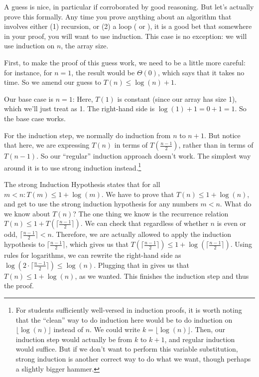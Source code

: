 A guess is nice, in particular if corroborated by good reasoning. But
let's actually prove this formally. Any time you prove anything about
an algorithm that involves either (1) recursion, or (2) a loop
( or ), it is a good bet that somewhere in your
proof, you will want to use induction.
This case is no exception: we will use induction on $n$, the array
size.

First, to make the proof of this guess work, we need to be a little more
careful: for instance, for $n=1$, the result would be $\Theta(0)$,
which says that it takes no time. So we amend our guess to
$T(n) \leq \log(n) + 1$.

Our base case is $n=1$: Here, $T(1)$ is constant (since our array has
size 1), which we'll just treat as 1. The right-hand side is
$\log(1) + 1 = 0+1 = 1$. So the base case works.

For the induction step, we normally do induction from $n$ to $n+1$. 
But notice that here, we are expressing $T(n)$ in terms of
$T(\frac{n-1}{2})$, rather than in terms of $T(n-1)$. 
So our ``regular'' induction approach doesn't work.
The simplest way around it is to use strong induction
instead.\footnote{For students sufficiently well-versed in induction
  proofs, it is worth noting that the ``clean'' way to do induction
  here would be to do induction on $\lfloor \log(n) \rfloor$ instead
  of $n$. We could write $k=\lfloor \log(n) \rfloor$. Then, our
  induction step would actually be from $k$ to $k+1$, and regular
  induction would suffice. But if we don't want to perform this
  variable substitution, strong induction is another correct way to do
  what we want, though perhaps a slightly bigger hammer.}

The strong Induction Hypothesis states that for all 
$m < n: T(m) \leq 1 + \log(m)$.
We have to prove that $T(n) \leq 1 + \log(n)$, and get to use the
strong induction hypothesis for any numbers $m < n$.
What do we know about $T(n)$? The one thing we know is the recurrence
relation $T(n) \leq 1 + T(\lceil \frac{n-1}{2} \rceil)$.
We can check that regardless of whether $n$ is even or odd, 
$\lceil \frac{n-1}{2} \rceil < n$. Therefore, we are actually allowed
to apply the induction hypothesis to $\lceil \frac{n-1}{2} \rceil$,
which gives us that
$T(\lceil \frac{n-1}{2} \rceil) \leq 1 + \log(\lceil \frac{n-1}{2} \rceil)$.
Using rules for logarithms, we can rewrite the right-hand side as
$\log(2 \cdot \lceil \frac{n-1}{2} \rceil) \leq \log(n)$.
Plugging that in gives us that $T(n) \leq 1 + \log(n)$, as we wanted.
This finishes the induction step and thus the proof. 

